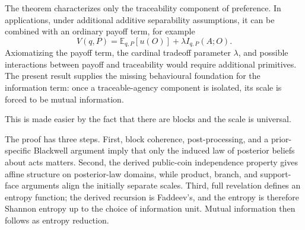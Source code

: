 \documentclass[11pt,a4paper]{article}
\theoremstyle{definition}
\newcommand{\E}{\mathbb E}
\newcommand{\1}{\mathbf 1}
\begin{document}
The theorem characterizes only the traceability component of preference.  In applications, under additional additive separability assumptions, it can be combined with an ordinary payoff term, for example
\[
V(q,P)=\E_{q,P}[u(O)]+\lambda I_{q,P}(A;O).
\]
Axiomatizing the payoff term, the cardinal tradeoff parameter $\lambda$, and possible interactions between payoff and traceability would require additional primitives.  The present result supplies the missing behavioural foundation for the information term: once a traceable-agency component is isolated, its scale is forced to be mutual information.

This is made easier by the fact that there are blocks and the scale is universal.

The proof has three steps.  First, block coherence, post-processing, and a prior-specific Blackwell argument imply that
only the induced law of posterior beliefs about acts matters.  Second, the derived public-coin independence property gives
affine structure on
posterior-law domains, while product, branch, and support-face arguments align the initially separate scales.  Third,
full revelation defines an entropy function; the derived recursion is Faddeev's, and the entropy is therefore Shannon
entropy up to the choice of information unit.  Mutual information then follows as entropy reduction.
\end{document}

